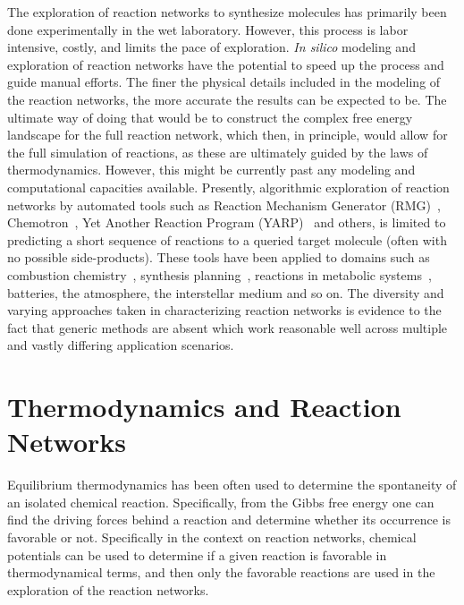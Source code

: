 The exploration of reaction networks to synthesize molecules has primarily been done experimentally in the wet laboratory. However, this process is labor intensive, costly, and limits the pace of exploration. \emph{In silico} modeling and exploration of reaction networks have the potential to speed up the process and guide manual efforts. The finer the physical details included in the modeling of the reaction networks, the more accurate the results can be expected to be. The ultimate way of doing that would be to construct the complex free energy landscape for the full reaction network, which then, in principle, would allow for the full simulation of reactions, as these are ultimately guided by the laws of thermodynamics.
However, this might be currently past any modeling and computational capacities available. 
Presently, algorithmic exploration of reaction networks by automated tools such as Reaction Mechanism Generator (RMG)~\cite{rmg2}, Chemotron~\cite{chemotron}, Yet Another Reaction Program (YARP)~\cite{yarp} and others, is limited to predicting a short sequence of reactions to a queried target molecule (often with no possible side-products). These tools have been applied to domains such as combustion chemistry~\cite{rmg2}, synthesis planning~\cite{retrosynthesis_comp,retrosynthesis_comp2,retrosynthesis_comp2}, reactions in metabolic systems~\cite{metabolic_comp,metabolic_comp2}, batteries, the atmosphere, the interstellar medium and so on. 
The diversity and varying approaches taken in characterizing reaction networks is evidence to the fact that generic methods are absent which work reasonable well across multiple and vastly differing application scenarios.

\section{Thermodynamics and Reaction Networks}

Equilibrium thermodynamics has been often used to determine the spontaneity of an isolated chemical reaction. Specifically, from the Gibbs free energy one can find the driving forces behind a reaction and determine whether its occurrence is favorable or not. Specifically in the context on reaction networks, chemical potentials can be used to determine if a given reaction is favorable in thermodynamical terms, and then only the favorable reactions are used in the exploration of the reaction networks.


